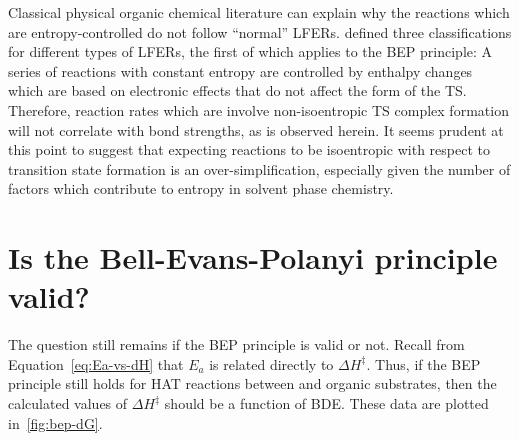 Classical physical organic chemical literature can explain why the reactions which are entropy-controlled do not follow ``normal'' LFERs.\cite{Exner1973} \citet{Blackadder1958} defined three classifications for different types of LFERs, the first of which applies to the BEP principle: A series of reactions with constant entropy are controlled by enthalpy changes which are based on electronic effects that do not affect the form of the TS. Therefore, reaction rates which are involve non-isoentropic TS complex formation will not correlate with bond strengths, as is observed herein. It seems prudent at this point to suggest that expecting reactions to be isoentropic with respect to transition state formation is an over-simplification, especially given the number of factors which contribute to entropy in solvent phase chemistry.

\section{Is the Bell-Evans-Polanyi principle valid?}

The question still remains if the BEP principle is valid or not. Recall from Equation~\ref{eq:Ea-vs-dH} that $E_a$ is related directly to $\Delta H^\ddagger$. Thus, if the BEP principle still holds for HAT reactions between \cumo and organic substrates, then the calculated values of $\Delta H^\ddagger$ should be a function of  BDE. These data are plotted in~\ref{fig:bep-dG}.

